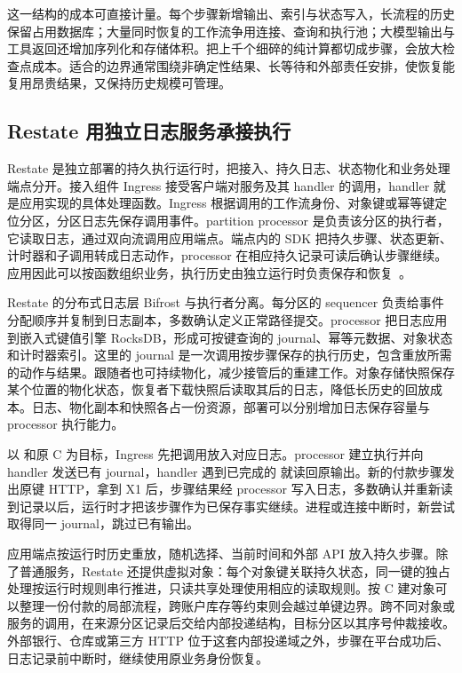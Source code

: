这一结构的成本可直接计量。每个步骤新增输出、索引与状态写入，长流程的历史保留占用数据库；大量同时恢复的工作流争用连接、查询和执行池；大模型输出与工具返回还增加序列化和存储体积。把上千个细碎的纯计算都切成步骤，会放大检查点成本。适合的边界通常围绕非确定性结果、长等待和外部责任安排，使恢复能复用昂贵结果，又保持历史规模可管理。

\subsection{Restate 用独立日志服务承接执行}

Restate 是独立部署的持久执行运行时，把接入、持久日志、状态物化和业务处理端点分开。接入组件 Ingress 接受客户端对服务及其 handler 的调用，handler 就是应用实现的具体处理函数。Ingress 根据调用的工作流身份、对象键或幂等键定位分区，分区日志先保存调用事件。partition processor 是负责该分区的执行者，它读取日志，通过双向流调用应用端点。端点内的 SDK 把持久步骤、状态更新、计时器和子调用转成日志动作，processor 在相应持久记录可读后确认步骤继续。应用因此可以按函数组织业务，执行历史由独立运行时负责保存和恢复~\cite{ch21-restate}。


Restate 的分布式日志层 Bifrost 与执行者分离。每分区的 sequencer 负责给事件分配顺序并复制到日志副本，多数确认定义正常路径提交。processor 把日志应用到嵌入式键值引擎 RocksDB，形成可按键查询的 journal、幂等元数据、对象状态和计时器索引。这里的 journal 是一次调用按步骤保存的执行历史，包含重放所需的动作与结果。跟随者也可持续物化，减少接管后的重建工作。对象存储快照保存某个位置的物化状态，恢复者下载快照后读取其后的日志，降低长历史的回放成本。日志、物化副本和快照各占一份资源，部署可以分别增加日志保存容量与 processor 执行能力。

以  和原 C 为目标，Ingress 先把调用放入对应日志。processor 建立执行并向 handler 发送已有 journal，handler 遇到已完成的  就读回原输出。新的付款步骤发出原键 HTTP，拿到 X1 后，步骤结果经 processor 写入日志，多数确认并重新读到记录以后，运行时才把该步骤作为已保存事实继续。进程或连接中断时，新尝试取得同一 journal，跳过已有输出。

应用端点按运行时历史重放，随机选择、当前时间和外部 API 放入持久步骤。除了普通服务，Restate 还提供虚拟对象：每个对象键关联持久状态，同一键的独占处理按运行时规则串行推进，只读共享处理使用相应的读取规则。按 C 建对象可以整理一份付款的局部流程，跨账户库存等约束则会越过单键边界。跨不同对象或服务的调用，在来源分区记录后交给内部投递结构，目标分区以其序号仲裁接收。外部银行、仓库或第三方 HTTP 位于这套内部投递域之外，步骤在平台成功后、日志记录前中断时，继续使用原业务身份恢复。

